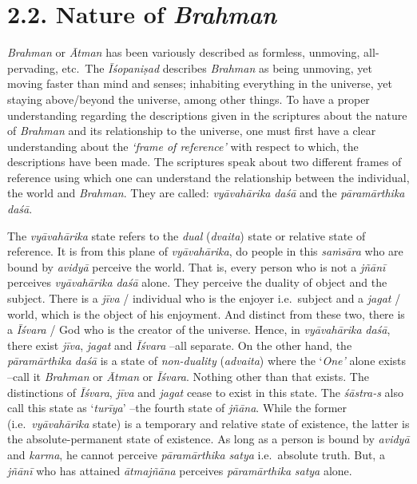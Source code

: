 \section*{2.2. Nature of \emph{Brahman}}
\vskip -5pt

\emph{Brahman} or \emph{Ātman} has been variously described as formless, unmoving, all-pervading, etc.\ The \emph{Īśopaniṣad} describes \emph{Brahman} as being unmoving, yet moving faster than mind and senses; inhabiting everything in the universe, yet staying above/beyond the universe, among other things. To have a proper understanding regarding the descriptions given in the scriptures about the nature of \emph{Brahman} and its relationship to the universe, one must first have a clear understanding about the \emph{`frame of reference'} with respect to which, the descriptions have been made. The scriptures speak about two different frames of reference using which one can understand the relationship between the individual, the world and \emph{Brahman}. They are called: \emph{vyāvahārika} \emph{daśā} and the \emph{pāramārthika} \emph{daśā}.

The \emph{vyāvahārika} state refers to the \emph{dual} (\emph{dvaita}) state or relative state of reference. It is from this plane of \emph{vyāvahārika}, do people in this \emph{saṁsāra} who are bound by \emph{avidyā} perceive the world. That is, every person who is not a \emph{jñānī} perceives \emph{vyāvahārika} \emph{daśā} alone. They perceive the duality of object and the subject. There is a \emph{jīva} / individual who is the enjoyer i.e.\ subject and a \emph{jagat} / world, which is the object of his enjoyment. And distinct from these two, there is a \emph{Īśvara} / God who is the creator of the universe. Hence, in \emph{vyāvahārika} \emph{daśā}, there exist \emph{jīva}, \emph{jagat} and \emph{Īśvara} --all separate. On the other hand, the \emph{pāramārthika} \emph{daśā} is a state of \emph{non-duality} (\emph{advaita}) where the `\emph{One'} alone exists --call it \emph{Brahman} or \emph{Ātman} or \emph{Īśvara}. Nothing other than that exists. The distinctions of \emph{Īśvara}, \emph{jīva} and \emph{jagat} cease to exist in this state. The \emph{śāstra-s} also call this state as `\emph{turīya}' --the fourth state of \emph{jñāna}. While the former (i.e.\ \emph{vyāvahārika} state) is a temporary and relative state of existence, the latter is the absolute-permanent state of existence. As long as a person is bound by \emph{avidyā} and \emph{karma}, he cannot perceive \emph{pāramārthika} \emph{satya} i.e.\ absolute truth. But, a \emph{jñānī} who has attained \emph{ātmajñāna} perceives \emph{pāramārthika} \emph{satya} alone.


